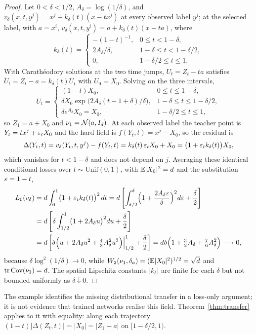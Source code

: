 \documentclass{article} %
\newcommand{\iclrbr}{\\&}\newcommand{\iclrbrq}{\\&\qquad}\newcommand{\iclrqbr}{\\&}
\newcommand{\iclrbr}{}\newcommand{\iclrbrq}{}\newcommand{\iclrqbr}{\qquad}
\theoremstyle{plain}
\theoremstyle{definition}
\theoremstyle{remark}
\begin{document}
\begin{proof}
Let $0<\delta<1/2$, $A_\delta=\log(1/\delta)$, and $v_\delta(x,t,y^j)=x^j+k_\delta(t)(x-tx^j)$ at
every observed label $y^j$; at the selected label, with $a=x^i$,
$v_\delta(x,t,y^i)=a+k_\delta(t)(x-ta)$, where
\[
k_\delta(t)=
\begin{cases}
-(1-t)^{-1},&0\le t<1-\delta,\\
2A_\delta/\delta,&1-\delta\le t<1-\delta/2,\\
0,&1-\delta/2\le t\le1.
\end{cases}
\]
With Carath\'eodory solutions at the two time jumps, $U_t=Z_t-ta$ satisfies
$\dot U_t=\dot Z_t-a=k_\delta(t)U_t$ with $U_0=X_0$. Solving on the three intervals,
\[
U_t=
\begin{cases}
(1-t)X_0,&0\le t\le1-\delta,\\
\delta X_0\exp\bigl(2A_\delta(t-1+\delta)/\delta\bigr),&1-\delta\le t\le1-\delta/2,\\
\delta e^{A_\delta}X_0=X_0,&1-\delta/2\le t\le1,
\end{cases}
\]
so $Z_1=a+X_0$ and $\nu_1=\mathcal{N}(a,I_d)$. At each observed label the teacher point is
$Y_t=tx^j+\varepsilon_tX_0$ and the hard field is $f(Y_t,t)=x^j-X_0$, so the residual is
\[
\Delta(Y_t,t)=v_\delta(Y_t,t,y^j)-f(Y_t,t)=k_\delta(t)\,\varepsilon_tX_0+X_0=\bigl(1+\varepsilon_tk_\delta(t)\bigr)X_0,
\]
which vanishes for $t<1-\delta$ and does not depend on $j$. Averaging these identical conditional
losses over $t\sim\mathrm{Unif}(0,1)$, with $\mathbb{E}|X_0|^2=d$ and the substitution $\varepsilon=1-t$,
\begin{align*}
L_0(v_\delta)
&=d\int_0^1\bigl(1+\eps_tk_\delta(t)\bigr)^2\,dt
=d\left[\int_{\delta/2}^{\delta}\Bigl(1+\frac{2A_\delta\eps}{\delta}\Bigr)^2d\eps+\frac\delta2\right]
\iclrbr=d\left[\delta\int_{1/2}^{1}\bigl(1+2A_\delta u\bigr)^2du+\frac\delta2\right]\\
&=d\left[\delta\Bigl(u+2A_\delta u^2+\tfrac43A_\delta^2u^3\Bigr)\Big|_{1/2}^{1}+\frac\delta2\right]
=d\delta\Bigl(1+\tfrac32A_\delta+\tfrac76A_\delta^2\Bigr)\longrightarrow0,
\end{align*}
because $\delta\log^2(1/\delta)\to0$, while $W_2(\nu_1,\delta_a)=(\mathbb{E}|X_0|^2)^{1/2}=\sqrt d$ and
$\operatorname{tr}\operatorname{Cov}(\nu_1)=d$. The spatial Lipschitz constants $|k_\delta|$ are finite for each $\delta$ but
not bounded uniformly as $\delta\downarrow0$.
\end{proof}

The example identifies the missing distributional transfer in a loss-only argument; it is not
evidence that trained networks realise this field. Theorem~\ref{thm:transfer} applies to it with
equality: along each trajectory $(1-t)|\Delta(Z_t,t)|=|X_0|=|Z_1-a|$ on $[1-\delta/2,1)$.
\end{document}
